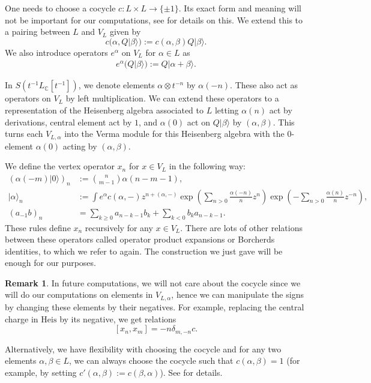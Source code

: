 \documentclass[11pt]{amsart}
\newcommand{\ket}[1]{|#1\rangle}
\renewcommand{\ge}{\geqslant}
\newcommand{\C}{\mathbb{C}}
\newcommand{\Heis}{\mathrm{Heis}}
\numberwithin{equation}{section}
\theoremstyle{plain}
\theoremstyle{definition}
\newtheorem{remark}[theorem]{Remark}
\begin{document}
One needs to choose a cocycle $c:L\times L\to\{\pm 1\}$. Its exact form and meaning will not be important for our computations, see \cite[Section 5.4]{FBZ04} for details on this. We extend this to a pairing between $L$ and $V_L$ given by
$$
c(\alpha,Q\ket\beta):=c(\alpha,\beta)Q\ket\beta.
$$
We also introduce operators $e^\alpha$ on $V_L$ for $\alpha\in L$ as
\begin{align*}
    e^\alpha(Q\ket\beta):=Q\ket{\alpha+\beta}.
\end{align*}

In $S(t^{-1}L_\C[t^{-1}])$, we denote elements $\alpha\otimes t^{-n}$ by $\alpha(-n)$. These also act as operators on $V_L$ by left multiplication. We can extend these operators to a representation of the Heisenberg algebra associated to $L$ letting $\alpha(n)$ act by derivations, central element act by $1$, and $\alpha(0)$ act on $Q\ket\beta$ by $(\alpha,\beta)$. This turns each $V_{L,\alpha}$ into the Verma module for this Heisenberg algebra with the $0$-element $\alpha(0)$ acting by $(\alpha,\beta)$.

We define the vertex operator $x_n$ for $x\in V_L$ in the following way:
\begin{align*}
    (\alpha(-m)\ket 0)_n&:=\binom{n}{m-1}\alpha(n-m-1),\\
    \ket\alpha_n&:=\int e^\alpha c(\alpha,-) z^{n+(\alpha,-)}\exp\left(\sum_{n>0}\frac{\alpha(-n)}nz^n\right)\exp\left(-\sum_{n>0}\frac{\alpha(n)}nz^{-n}\right),\\
    (a_{-1}b)_n&=\sum_{k\ge 0}a_{n-k-1}b_k+\sum_{k<0}b_{k}a_{n-k-1}.
\end{align*}
These rules define $x_n$ recursively for any $x\in V_L$. There are lots of other relations between these operators called operator product expansions or Borcherds identities, to which we refer to \cite{FBZ04} again. The construction we just gave will be enough for our purposes.

\begin{remark}
    In future computations, we will not care about the cocycle since we will do our computations on elements in $V_{L,\alpha}$, hence we can manipulate the signs by changing these elements by their negatives. For example, replacing the central charge in $\Heis$ by its negative, we get relations
    $$
    [x_n,x_m]=-n\delta_{m,-n}c.
    $$

    Alternatively, we have flexibility with choosing the cocycle and for any two elements $\alpha,\beta\in L$, we can always choose the cocycle such that $c(\alpha,\beta)=1$ (for example, by setting $c'(\alpha,\beta):=c(\beta,\alpha)$). See \cite[Remark 5.5a]{Kac98} for details.
\end{remark}
\end{document}
